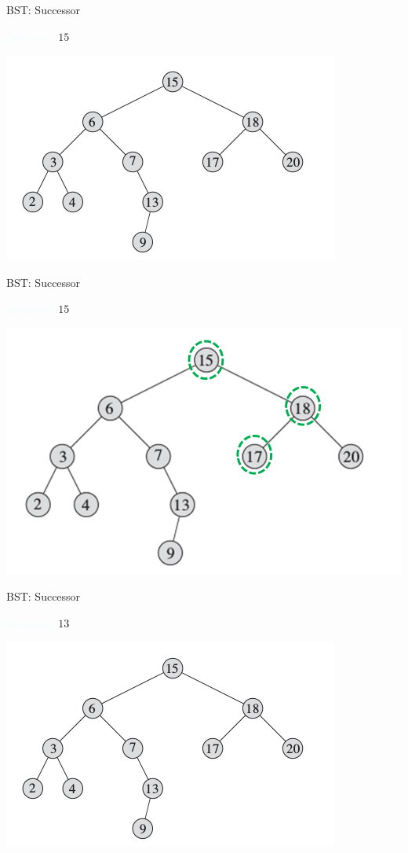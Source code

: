 \documentclass{beamer}
\newcommand{\tblue}[1]{{\Large {\textcolor{azure}{#1}}}}
\begin{document}
\begin{frame}{BST: Successor}

\tblue{Successor:} $15$
    \begin{center}
        \includegraphics[scale=0.7]{bstSearch.png}
    \end{center}
\end{frame}


\begin{frame}{BST: Successor}

\tblue{Successor:} $15$
    \begin{center}
        \includegraphics[scale=0.5]{bstSuccessor2.png}
    \end{center}
\end{frame}

\begin{frame}{BST: Successor}

\tblue{Successor:} $13$
    \begin{center}
        \includegraphics[scale=0.7]{bstSearch.png}
    \end{center}
\end{frame}
\end{document}
